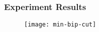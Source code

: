 \begin{frame}
  \frametitle{Experiment Results}
  \begin{figure}
    \centering
    \texttt{[image: min-bip-cut]}
  \end{figure}
\end{frame}
